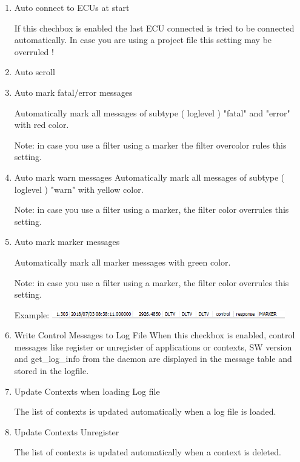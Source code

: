 \documentclass[a4paper,11pt]{article}
\begin{document}
\begin{enumerate}

\item{Auto connect to ECUs at start}

If this chechbox is enabled the last ECU connected is tried to be connected automatically.
In case you are using a project file this setting may be overruled !

\item{Auto scroll}

\item{Auto mark fatal/error messages}

Automatically mark all messages of subtype ( loglevel ) "fatal" and "error" with red color.

Note: in case you use a filter using a marker the filter overcolor rules this setting.

\item{Auto mark warn messages}
Automatically mark all messages of subtype ( loglevel ) "warn" with yellow color.

Note: in case you use a filter using a marker, the filter color overrules this setting.


\item{Auto mark marker messages}

\label{automarkmarker}
Automatically mark all marker messages with green color.

Note: in case you use a filter using a marker, the filter color overrules this setting.

Example:
\includegraphics[width=0.8\textwidth]{images/markermessage.png}

\item{Write Control Messages to Log File}
\label{controlmessagestolog}
When this checkbox is enabled, control messages like register or unregister of applications or contexts, SW version and get\_log\_info from the daemon are displayed
in the message table and stored in the logfile.

\item{Update Contexts when loading Log file }

The list of contexts is updated automatically when a log file is loaded.


\item{Update Contexts Unregister}

The list of contexts is updated automatically when a context is deleted.



\end{enumerate}
\end{document}
